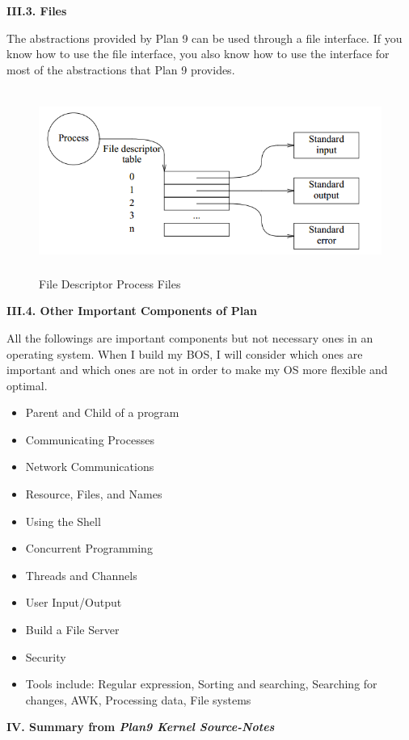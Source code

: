 \documentclass[a4paper,12pt]{report}
\begin{document}
\noindent
\textbf{III.3. Files}

\noindent
The abstractions provided by Plan 9 can be used through a file interface. If you know how to use the file interface, you also know how to use the interface for most of the abstractions that Plan 9 provides.

\begin{figure}[h]
\centering	
\includegraphics[width=14cm, height=6cm]{"pic2"}
\caption{File Descriptor Process Files}
\end{figure}

\noindent
\textbf{III.4. Other Important Components of Plan} 

\noindent
All the followings are important components but not necessary ones in an operating system. When I build my BOS, I will consider which ones are important and which ones are not in order to make my OS more flexible and optimal. 

\begin{itemize}
\item Parent and Child of a program
\item Communicating Processes
\item Network Communications
\item Resource, Files, and Names
\item Using the Shell
\item Concurrent Programming
\item Threads and Channels
\item User Input/Output
\item Build a File Server
\item Security
\item Tools include: Regular expression, Sorting and searching, Searching for changes, AWK, Processing data, File systems
\end{itemize}

\noindent
\textbf{IV. Summary from \textit{Plan9 Kernel Source-Notes}}
\end{document}
